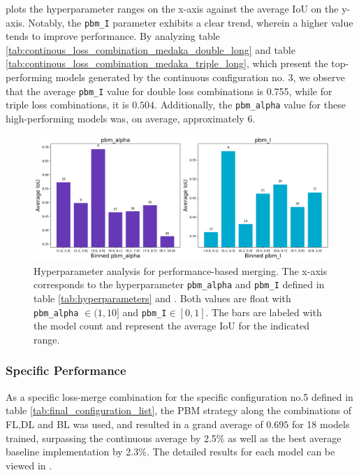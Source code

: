  plots the hyperparameter ranges on the x-axis against the average IoU on the y-axis. Notably, the \texttt{pbm\_I} parameter exhibits a clear trend, wherein a higher value tends to improve performance. By analyzing table \ref{tab:continous_loss_combination_medaka_double_long} and table \ref{tab:continous_loss_combination_medaka_triple_long}, which present the top-performing models generated by the continuous configuration no. 3, we observe that the average \texttt{pbm\_I} value for double loss combinations is 0.755, while for triple loss combinations, it is $0.504$. Additionally, the \texttt{pbm\_alpha} value for these high-performing models was, on average, approximately $6$.
\begin{figure}[H]%
  \centering
  \includegraphics[width=\imgWidthL]{images/continous_hyperparameter_total_medaka.png}
  \caption[Hyperparameter analysis]{Hyperparameter analysis for performance-based merging. The x-axis corresponds to the hyperparameter \texttt{pbm\_alpha} and \texttt{pbm\_I} defined in table \ref{tab:hyperparameters} and . Both values are float with \texttt{pbm\_alpha} $\in (1,10]$ and \texttt{pbm\_I}$\in [0,1]$. The bars are labeled with the model count and represent the average \ac{IoU} for the indicated range.}
  \label{continous_results_total_medaka}
\end{figure}

\subsubsection*{Specific Performance}
As a specific loss-merge combination for the specific configuration no.5 defined in table \ref{tab:final_configuration_list}, the PBM strategy along the combinations of \ac{FL},\ac{DL} and \ac{BL} was used, and resulted in a grand average of $0.695$ for 18 models trained, surpassing the continuous average by 2.5\% as well as the best average baseline implementation by 2.3\%. The detailed results for each model can be viewed in .

